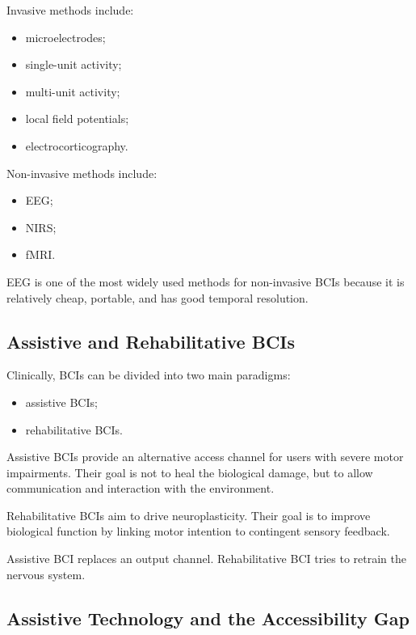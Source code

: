 Invasive methods include:

\begin{itemize}[noitemsep]
    \item microelectrodes;
    \item single-unit activity;
    \item multi-unit activity;
    \item local field potentials;
    \item electrocorticography.
\end{itemize}

Non-invasive methods include:

\begin{itemize}[noitemsep]
    \item EEG;
    \item NIRS;
    \item fMRI.
\end{itemize}

EEG is one of the most widely used methods for non-invasive BCIs because it is relatively cheap, portable, and has good temporal resolution.

\subsection{Assistive and Rehabilitative BCIs}

Clinically, BCIs can be divided into two main paradigms:

\begin{itemize}[noitemsep]
    \item assistive BCIs;
    \item rehabilitative BCIs.
\end{itemize}

Assistive BCIs provide an alternative access channel for users with severe motor impairments. Their goal is not to heal the biological damage, but to allow communication and interaction with the environment.

Rehabilitative BCIs aim to drive neuroplasticity. Their goal is to improve biological function by linking motor intention to contingent sensory feedback.

\begin{authornote}
Assistive BCI replaces an output channel. Rehabilitative BCI tries to retrain the nervous system.
\end{authornote}

\subsection{Assistive Technology and the Accessibility Gap}

